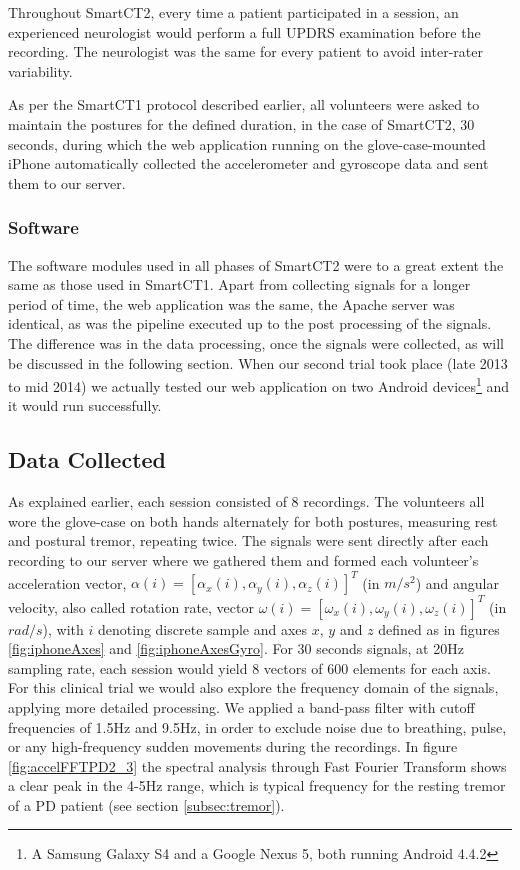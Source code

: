 Throughout \gls{SmartCT2}, every time a patient participated in a session, an experienced neurologist would perform a full \gls{UPDRS} examination before the recording. The neurologist was the same for every patient to avoid inter-rater variability. 

As per the \gls{SmartCT1} protocol described earlier, all volunteers were asked to maintain the postures for the defined duration, in the case of \gls{SmartCT2}, 30 seconds, during which the web application running on the glove-case-mounted iPhone automatically collected the accelerometer and gyroscope data and sent them to our server.
 
\subsubsection{Software}
\label{subsubsec:smartCT2Software}
The software modules used in all phases of \gls{SmartCT2} were to a great extent the same as those used in \gls{SmartCT1}. Apart from collecting signals for a longer period of time, the web application was the same, the Apache server was identical, as was the pipeline executed up to the post processing of the signals. The difference was in the data processing, once the signals were collected, as will be discussed in the following section. When our second trial took place (late 2013 to mid 2014) we actually tested our web application on two Android devices\footnote{A Samsung Galaxy S4 and a Google Nexus 5, both running Android 4.4.2} and it would run successfully. 

\subsection{Data Collected}
\label{subsec:SmartCT2Data}

As explained earlier, each session consisted of 8 recordings. The volunteers all wore the glove-case on both hands alternately for both postures, measuring rest and postural tremor, repeating twice. The signals were sent directly after each recording to our server where we gathered them and formed each volunteer's acceleration vector, $\alpha(i) = [\alpha_{x}(i),\alpha_{y}(i),\alpha_{z}(i)]^{T}$ (in $m/s^{2}$) and angular velocity, also called rotation rate, vector $\omega(i) = [\omega_{x}(i),\omega_{y}(i),\omega_{z}(i)]^{T}$ (in $rad/s$), with $i$ denoting discrete sample and axes $x$, $y$ and $z$ defined as in figures \ref{fig:iphoneAxes} and \ref{fig:iphoneAxesGyro}. For 30 seconds signals, at 20Hz sampling rate, each session would yield 8 vectors of 600 elements for each axis. For this clinical trial we would also explore the frequency domain of the signals, applying more detailed processing. We applied a band-pass filter with cutoff frequencies of 1.5Hz and 9.5Hz, in order to exclude noise due to breathing, pulse, or any high-frequency sudden movements during the recordings. In figure \ref{fig:accelFFTPD2_3} the spectral analysis through Fast Fourier Transform shows a clear peak in the 4-5Hz range, which is typical frequency for the resting tremor of a \gls{PD} patient (see section \ref{subsec:tremor}). 

